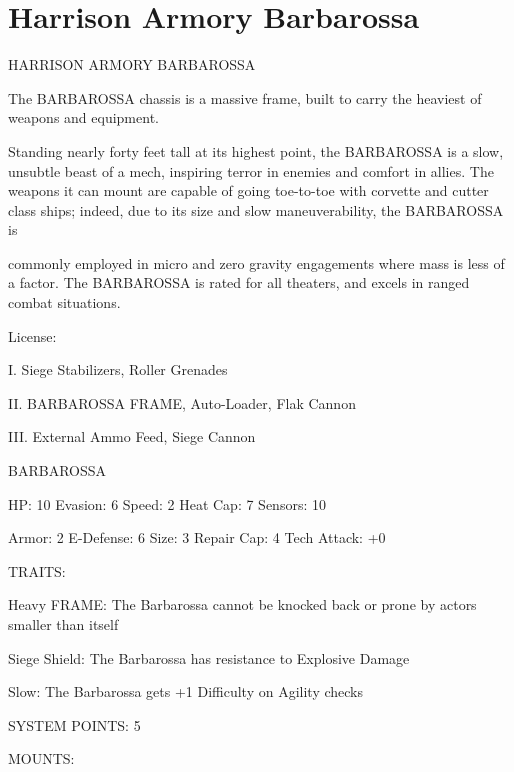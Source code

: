 \section{Harrison Armory Barbarossa}

                           HARRISON ARMORY BARBAROSSA  

The BARBAROSSA chassis is a massive frame, built to carry the heaviest of weapons and equipment.  

Standing nearly forty feet tall at its highest point, the BARBAROSSA is a slow, unsubtle beast of a mech,  
inspiring terror in enemies and comfort in allies. The weapons it can mount are capable of going toe-to-toe  
with corvette and cutter class ships; indeed, due to its size and slow maneuverability, the BARBAROSSA is  

                                                                                                          


commonly employed in micro and zero gravity engagements where mass is less of a factor. The  
BARBAROSSA is rated for all theaters, and excels in ranged combat situations.   

                                                  License:
 
I. Siege Stabilizers, Roller Grenades
 
II. BARBAROSSA FRAME, Auto-Loader, Flak Cannon
 
III. External Ammo Feed, Siege Cannon
 

                                            BARBAROSSA 

 HP: 10         Evasion: 6                           Speed: 2           Heat Cap: 7       Sensors: 10 

 Armor:  2      E-Defense: 6                         Size: 3            Repair Cap: 4     Tech Attack:  
                                                                                          +0 

                                                  TRAITS: 

 Heavy FRAME: The Barbarossa cannot be knocked back or prone by actors smaller than itself
 
 Siege Shield: The Barbarossa has resistance to Explosive Damage
 
 Slow: The Barbarossa gets +1 Difficulty on Agility checks 

                                           SYSTEM POINTS: 5 

                                                 MOUNTS: 

